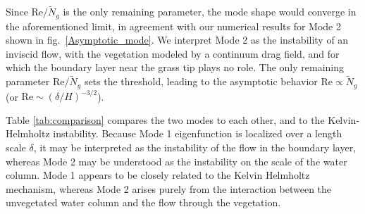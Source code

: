 \documentclass[aps,prl,twocolumn,superscriptaddress,10pt]{revtex4-1}  %
\newcommand{\hg}{h_g}
\newcommand{\Rey}{\text{Re}}
\newcommand{\Ndg}{\tilde{N}_g}
\begin{document}
Since $\Rey/\Ndg$ is the only remaining parameter, the mode shape would converge in the aforementioned limit, in agreement with our numerical results for Mode 2 shown in fig.~\ref{Asymptotic_mode}. 
We interpret Mode 2 as the instability of an inviscid flow, with the vegetation modeled by a continuum drag field, and for which the boundary layer near the grass tip plays no role. The only remaining parameter $\Rey/\Ndg$ 
sets the threshold, leading to the asymptotic behavior $\Rey \propto \Ndg$ (or $\Rey \sim ({\delta}/{H})^{-3/2}$).

Table \ref{tab:comparison} compares the two modes to each other, and to the Kelvin-Helmholtz instability. 
Because Mode 1 eigenfunction is localized over a length scale $\delta$, it may be interpreted as the instability of the flow in the boundary layer, whereas Mode 2 may be understood as the instability on the scale of the water column. 
Mode 1 appears to be closely related to the Kelvin Helmholtz mechanism, whereas Mode 2 arises purely from the interaction between the unvegetated water column and the flow through the vegetation. 
\end{document}
